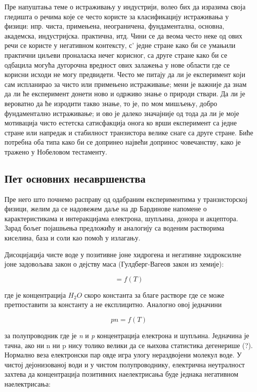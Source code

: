 \documentclass{article}
\begin{document}
Пре напуштања теме о истраживању у индустрији, волео бих да изразима своја гледишта о речима које се често користе за класификацију истраживања у физици: нпр. чиста, примењена, неограничена, фундаментална, основна, академска, индустријска. практична, итд. Чини се да веома често неке од ових речи се користе у негативном контексту, с' једне стране како би се умањили практични циљеви проналаска нечег корисног, са друге стране како би се одбацила могућа дугорочна вредност ових залажења у нове области где се корисни исходи не могу предвидети.  Често ме питају да ли је експеримент који сам испланирао за чисто или примењено истраживање; мени је важније да знам да ли ће експеримент донети ново и одрживо знање о природи ствари. Да ли је вероватно да ће изродити такво знање, то је, по мом мишљењу, добро фундаментално истраживање; и ово је далеко значајније од тода да ли је моје мотивација чисто естетска сатисфакција онога ко врши експеримент са једне стране или напредак и стабилност транзистора велике снаге са друге стране. Биће потребна оба типа како би се допринео највећи допринос човечанству, како је тражено у Нобеловом тестаменту.

\subsection{Пет основних несавршенства}

Пре него што почнемо расправу од одабраним експериментима у транзисторској физици, желим да се надовежем даље на др Бардинове напомене о карактеристикама и интеракцијама електрона, шупљина, донора и акцептора. Зарад бољег појашњења предложићу и аналогију са воденим растворима киселина, база и соли као помоћ у излагању.

Дисоцијација чисте воде у позитивне јоне хидрогена и негативне хидроксилне јоне задовољава закон о дејству маса (Гулдберг-Вагеов закон из хемије):

\begin{equation}
    [H^+] [OH^-] = f(T)
\end{equation}

где је концентрација $H_2O$ скоро константа за благе растворе где се може претпоставити за константу а не експлицитно. Аналогно овој једначини 

\begin{equation}
    p n = f(T)
\end{equation}

за полупроводник где је \textit{n} и \textit{p} концентрација електрона и шупљина. Једначина је тачна, ако ни n ни p нису толико велики да се њихова статистика дегенерише (?). Нормално веза електронски пар овде игра улогу нераздвојени молекул воде. У чистој дејонизованој води и у чистом полупроводнику, електрична неутралност захтева да концентрација позитивних наелектрисања буде једнака негативном наелектрисања:
\end{document}
